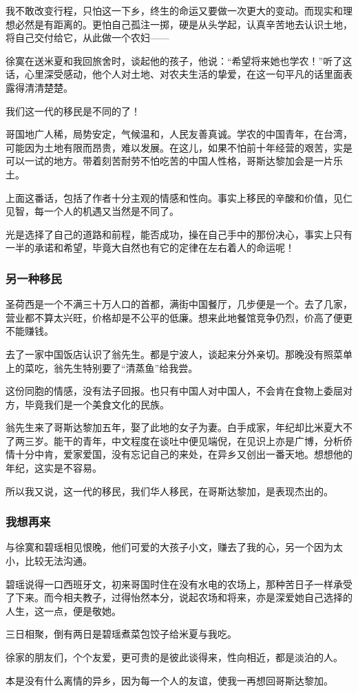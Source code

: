 \par 我不敢改变行程，只怕这一下乡，终生的命运又要做一次更大的变动。而现实和理想必然是有距离的。更怕自己孤注一掷，硬是从头学起，认真辛苦地去认识土地，将自己交付给它，从此做一个农妇——
\par 徐寞在送米夏和我回旅舍时，谈起他的孩子，他说：“希望将来她也学农！”听了这话，心里深受感动，他个人对土地、对农夫生活的挚爱，在这一句平凡的话里面表露得清清楚楚。
\par 我们这一代的移民是不同的了！
\par 哥国地广人稀，局势安定，气候温和，人民友善真诚。学农的中国青年，在台湾，可能因为土地有限而昂贵，难以发展。在这儿，如果不怕前十年经营的艰苦，实是可以一试的地方。带着刻苦耐劳不怕吃苦的中国人性格，哥斯达黎加会是一片乐土。
\par 上面这番话，包括了作者十分主观的情感和性向。事实上移民的辛酸和价值，见仁见智，每一个人的机遇又当然是不同了。
\par 光是选择了自己的道路和前程，能否成功，操在自己手中的那份决心，事实上只有一半的承诺和希望，毕竟大自然也有它的定律在左右着人的命运呢！
\subsubsection*{另一种移民}
\par 圣荷西是一个不满三十万人口的首都，满街中国餐厅，几步便是一个。去了几家，营业都不算太兴旺，价格却是不公平的低廉。想来此地餐馆竞争仍烈，价高了便更不能赚钱。
\par 去了一家中国饭店认识了翁先生。都是宁波人，谈起来分外亲切。那晚没有照菜单上的菜吃，翁先生特别要了“清蒸鱼”给我尝。
\par 这份同胞的情感，没有法子回报。也只有中国人对中国人，不会肯在食物上委屈对方，毕竟我们是一个美食文化的民族。
\par 翁先生来了哥斯达黎加五年，娶了此地的女子为妻。白手成家，年纪却比米夏大不了两三岁。能干的青年，中文程度在谈吐中便见端倪，在见识上亦是广博，分析侨情十分中肯，爱家爱国，没有忘记自己的来处，在异乡又创出一番天地。想想他的年纪，这实是不容易。
\par 所以我又说，这一代的移民，我们华人移民，在哥斯达黎加，是表现杰出的。
\subsubsection*{我想再来}
\par 与徐寞和碧瑶相见恨晚，他们可爱的大孩子小文，赚去了我的心，另一个因为太小，比较无法沟通。
\par 碧瑶说得一口西班牙文，初来哥国时住在没有水电的农场上，那种苦日子一样承受了下来。而今相夫教子，过得怡然本分，说起农场和将来，亦是深爱她自己选择的人生，这一点，便是敬她。
\par 三日相聚，倒有两日是碧瑶煮菜包饺子给米夏与我吃。
\par 徐家的朋友们，个个友爱，更可贵的是彼此谈得来，性向相近，都是淡泊的人。
\par 本是没有什么离情的异乡，因为每一个人的友谊，使我一再想回哥斯达黎加。
